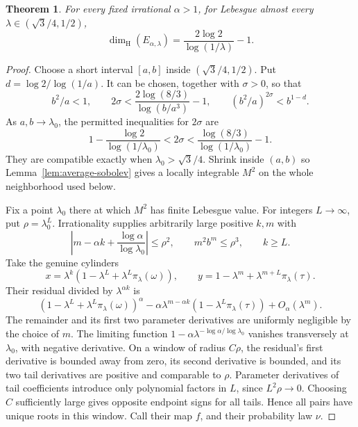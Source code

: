 \documentclass[11pt,a4paper]{amsart}
\numberwithin{equation}{section}
\newtheorem{theorem}{Theorem}[section]
\theoremstyle{definition}
\begin{document}
\begin{theorem}\label{thm:ae-dimension}
For every fixed irrational \(\alpha>1\), for Lebesgue almost every
\(\lambda\in(\sqrt3/4,1/2)\),
\[
\dim_{\mathrm H}(E_{\alpha,\lambda})=\frac{2\log2}{\log(1/\lambda)}-1.
\]
\end{theorem}
\begin{proof}
Choose a short interval \([a,b]\) inside
\((\sqrt3/4,1/2)\). Put \(d=\log2/\log(1/a)\).
It can be chosen, together with \(\sigma>0\), so that
\begin{equation}
b^2/a<1,\qquad
2\sigma<\frac{2\log(8/3)}{\log(b/a^3)}-1,\qquad
(b^2/a)^{2\sigma}<b^{1-d}.
\label{eq:ae-exponents}
\end{equation}
As \(a,b\to\lambda_0\), the permitted inequalities for \(2\sigma\)
are
\[
1-\frac{\log2}{\log(1/\lambda_0)}
<2\sigma<
\frac{\log(8/3)}{\log(1/\lambda_0)}-1.
\]
They are compatible exactly when \(\lambda_0>\sqrt3/4\).
Shrink inside \((a,b)\) so Lemma~\ref{lem:average-sobolev}
gives a locally integrable \(M^2\) on the whole neighborhood
used below.

Fix a point \(\lambda_0\) there at which \(M^2\) has finite
Lebesgue value. For integers \(L\to\infty\), put
\(\rho=\lambda_0^L\).
Irrationality supplies arbitrarily large positive \(k,m\) with
\[
\left|m-\alpha k+\frac{\log \alpha}{\log\lambda_0}\right|\leq\rho^2,
\qquad m^2b^m\leq\rho^3,\qquad k\geq L.
\]
Take the genuine cylinders
\begin{equation}
x=\lambda^k(1-\lambda^L+\lambda^L\pi_\lambda(\omega)),
\qquad y=1-\lambda^m+\lambda^{m+L}\pi_\lambda(\tau).
\label{eq:centered-cylinders}
\end{equation}
Their residual divided by \(\lambda^{\alpha k}\) is
\begin{equation}
(1-\lambda^L+\lambda^L\pi_\lambda(\omega))^\alpha
-\alpha\lambda^{m-\alpha k}(1-\lambda^L\pi_\lambda(\tau))
+O_\alpha(\lambda^m).
\label{eq:centered-residual}
\end{equation}
The remainder and its first two parameter derivatives are
uniformly negligible by the choice of \(m\).
The limiting function \(1-\alpha\lambda^{-\log \alpha/\log\lambda_0}\)
vanishes transversely at \(\lambda_0\), with negative derivative.
On a window of radius \(C\rho\), the residual's first derivative
is bounded away from zero, its second derivative is bounded,
and its two tail derivatives are positive and comparable to
\(\rho\). Parameter derivatives of tail coefficients introduce
only polynomial factors in \(L\), since \(L^2\rho\to0\).
Choosing \(C\) sufficiently large gives opposite endpoint signs
for all tails. Hence all pairs have unique roots in this window.
Call their map \(f\), and their probability law \(\nu\).


\end{proof}
\end{document}
